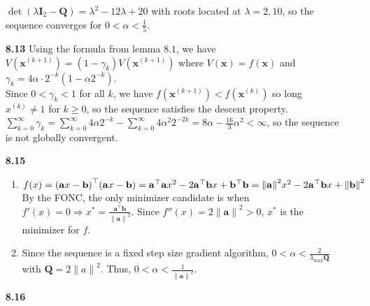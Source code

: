 \documentclass[10pt]{article}
\begin{document}
\begin{enumerate}
    $\det(\lambda\mathbf{I}_2-\mathbf{Q})=\lambda^2-12\lambda+20$ with roots located at $\lambda=2,10$, so the sequence converges for $0<\alpha<\frac{1}{5}$.
    \item [\textbf{8.13}] Using the formula from lemma $8.1$, we have $V(\mathbf{x}^{(k+1)})=(1-\gamma_k)V(\mathbf{x}^{(k+1)})$ where $V(\mathbf{x})=f(\mathbf{x})$
    and $\gamma_k=4\alpha \cdot2^{-k}(1-\alpha 2^{-k})$.\\
    Since $0<\gamma_k<1$ for all $k$, we have $f(\mathbf{x}^{(k+1)})<f(\mathbf{x}^{(k)})$ so long $x^{(k)}\neq 1$ for $k\ge0$, so the sequence satisfies the descent property.\\
    $\displaystyle \sum_{k=0}^{\infty}\gamma_k=\sum_{k=0}^{\infty}4\alpha 2^{-k}-\sum_{k=0}^{\infty}4\alpha^2 2^{-2k}=8\alpha-\frac{16}{3}\alpha^2<\infty$, so the sequence is not globally convergent.
    \item [\textbf{8.15}]\begin{enumerate}
        \item $f(x)={(\mathbf{a}x-\mathbf{b})}^\top (\mathbf{a}x-\mathbf{b})={\mathbf{a}}^\top \mathbf{a}x^2-2{\mathbf{a}}^\top \mathbf{b}x+{\mathbf{b}}^\top {\mathbf{b}\\
        =\lVert \mathbf{a}\rVert}^2x^2-2{\mathbf{a}}^\top \mathbf{b}x+{\lVert \mathbf{b}\rVert}^2$\\
        By the FONC, the only minimizer candidate is when $f'(x)=0\Rightarrow x^*=\frac{{\mathbf{a}}^\top \mathbf{b}}{{\lVert \mathbf{a}\rVert}^2}$. Since $f''(x)=2{\lVert \mathbf{a}\rVert}^2>0$, $x^*$ is the minimizer for $f$.
        \item Since the sequence is a fixed step size gradient algorithm, $0<\alpha<\frac{2}{\lambda_{\max}\mathbf{Q}}$ with $\mathbf{Q}=2{\lVert a\rVert}^2$. Thus, $0<\alpha<\frac{1}{{\lVert \mathbf{a}\rVert}^2}$.
    \end{enumerate}
    \item [\textbf{8.16}]
\end{enumerate}
\end{document}
